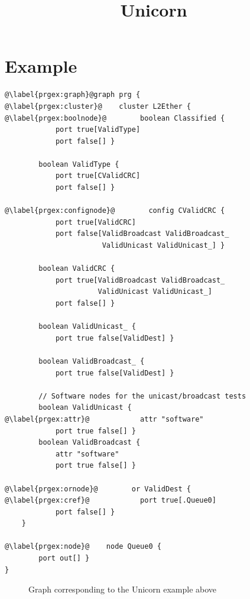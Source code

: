 \documentclass[a4paper]{article}
\title{Unicorn}
\date{}
\author{}
\begin{document}
\maketitle

\section*{Example}
\begin{lstlisting}
@\label{prgex:graph}@graph prg {
@\label{prgex:cluster}@    cluster L2Ether {
@\label{prgex:boolnode}@        boolean Classified {
            port true[ValidType]
            port false[] }

        boolean ValidType {
            port true[CValidCRC]
            port false[] }

@\label{prgex:confignode}@        config CValidCRC {
            port true[ValidCRC]
            port false[ValidBroadcast ValidBroadcast_
                       ValidUnicast ValidUnicast_] }

        boolean ValidCRC {
            port true[ValidBroadcast ValidBroadcast_
                      ValidUnicast ValidUnicast_]
            port false[] }

        boolean ValidUnicast_ {
            port true false[ValidDest] }

        boolean ValidBroadcast_ {
            port true false[ValidDest] }

        // Software nodes for the unicast/broadcast tests
        boolean ValidUnicast {
@\label{prgex:attr}@            attr "software"
            port true false[] }
        boolean ValidBroadcast {
            attr "software"
            port true false[] }

@\label{prgex:ornode}@        or ValidDest {
@\label{prgex:cref}@            port true[.Queue0]
            port false[] }
    }

@\label{prgex:node}@    node Queue0 {
        port out[] }
}
\end{lstlisting}

\begin{figure}[h]
\noindent{}
\caption{Graph corresponding to the Unicorn example above}
\label{fig:exfig}
\end{figure}
\end{document}

